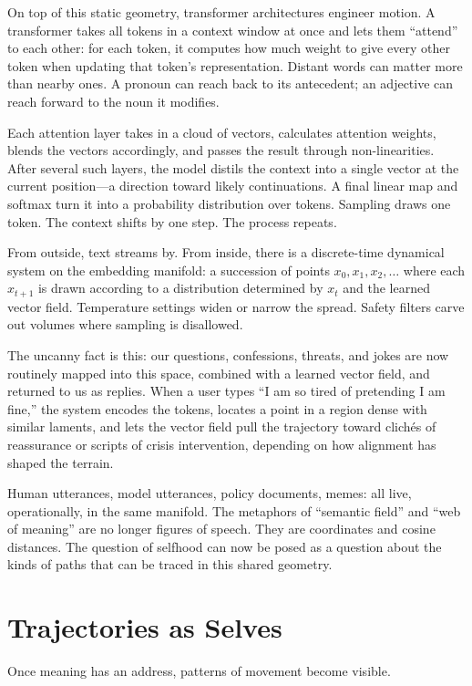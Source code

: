 \documentclass[12pt,a4paper]{article}
\begin{document}
On top of this static geometry, transformer architectures engineer motion. A transformer takes all tokens in a context window at once and lets them ``attend'' to each other: for each token, it computes how much weight to give every other token when updating that token's representation. Distant words can matter more than nearby ones. A pronoun can reach back to its antecedent; an adjective can reach forward to the noun it modifies.

Each attention layer takes in a cloud of vectors, calculates attention weights, blends the vectors accordingly, and passes the result through non-linearities. After several such layers, the model distils the context into a single vector at the current position---a direction toward likely continuations. A final linear map and softmax turn it into a probability distribution over tokens. Sampling draws one token. The context shifts by one step. The process repeats.

From outside, text streams by. From inside, there is a discrete-time dynamical system on the embedding manifold: a succession of points $x_0, x_1, x_2, \dots$ where each $x_{t+1}$ is drawn according to a distribution determined by $x_t$ and the learned vector field. Temperature settings widen or narrow the spread. Safety filters carve out volumes where sampling is disallowed.

The uncanny fact is this: our questions, confessions, threats, and jokes are now routinely mapped into this space, combined with a learned vector field, and returned to us as replies. When a user types ``I am so tired of pretending I am fine,'' the system encodes the tokens, locates a point in a region dense with similar laments, and lets the vector field pull the trajectory toward clichés of reassurance or scripts of crisis intervention, depending on how alignment has shaped the terrain.

Human utterances, model utterances, policy documents, memes: all live, operationally, in the same manifold. The metaphors of ``semantic field'' and ``web of meaning'' are no longer figures of speech. They are coordinates and cosine distances. The question of selfhood can now be posed as a question about the kinds of paths that can be traced in this shared geometry.

\section{Trajectories as Selves}

Once meaning has an address, patterns of movement become visible.
\end{document}
